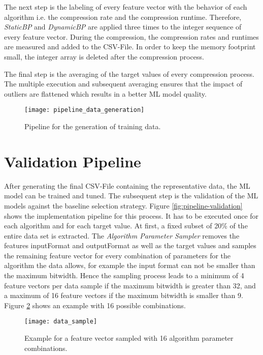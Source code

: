 The next step is the labeling of every feature vector with the behavior of each algorithm i.e. the compression rate and the compression runtime. Therefore, \emph{StaticBP} and \emph{DynamicBP} are applied three times to the integer sequence of every feature vector. During the compression, the compression rates and runtimes are measured and added to the CSV-File. In order to keep the memory footprint small, the integer array is deleted after the compression process. 

The final step is the averaging of the target values of every compression process. The multiple execution and subsequent averaging ensures that the impact of outliers are flattened which results in a better ML model quality.

\begin{figure}[h]
    \texttt{[image: pipeline\_data\_generation]}
    \caption{Pipeline for the generation of training data.}
    \label{fig:pipeline-data-generation}
\end{figure}

\section{Validation Pipeline}
After generating the final CSV-File containing the representative data, the ML model can be trained and tuned. The subsequent step is the validation of the ML models against the baseline selection strategy. Figure \ref{fig:pipeline-validation} shows the implementation pipeline for this process. It has to be executed once for each algorithm and for each target value. At first, a fixed subset of 20\% of the entire data set is extracted. The \emph{Algorithm Parameter Sampler} removes the features inputFormat and outputFormat as well as the target values and samples the remaining feature vector for every combination of parameters for the algorithm the data allows, for example the input format can not be smaller than the maximum bitwidth. Hence the sampling process leads to a minimum of 4 feature vectors per data sample if the maximum bitwidth is greater than 32, and a maximum of 16 feature vectors if the maximum bitwidth is smaller than 9. Figure \ref{fig:data-sample} shows an example with 16 possible combinations. 

\begin{figure}[h]
    \centering
    \texttt{[image: data\_sample]}
    \caption{Example for a feature vector sampled with 16 algorithm parameter combinations.}
    \label{fig:data-sample}
\end{figure}

